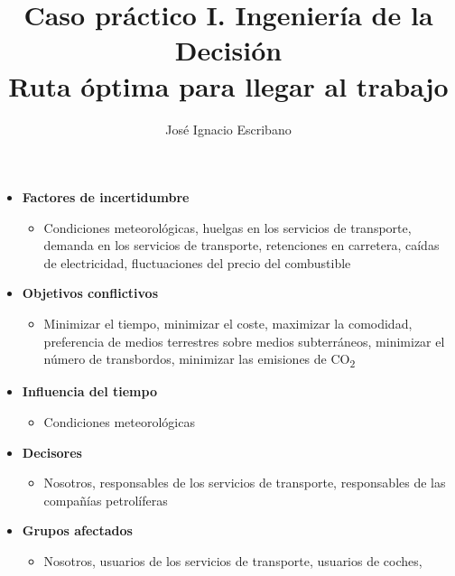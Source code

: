 \documentclass[11pt,a4paper,twoside,openright,final]{article}
\author{José Ignacio Escribano}
\title{Caso práctico I. Ingeniería de la Decisión \\ \textbf{Ruta óptima para llegar al trabajo}}
\begin{document}
\maketitle

\begin{itemize}

\item \textbf{Factores de incertidumbre}

\begin{itemize}
\item Condiciones meteorológicas, huelgas en los servicios de transporte, demanda en los servicios de transporte, retenciones en carretera, caídas de electricidad, fluctuaciones del precio del combustible
\end{itemize}

\item \textbf{Objetivos conflictivos}

\begin{itemize}
\item Minimizar el tiempo, minimizar el coste, maximizar la comodidad, preferencia de medios terrestres sobre medios subterráneos, minimizar el número de transbordos, minimizar las emisiones de CO\textsubscript{2}
\end{itemize}

\item \textbf{Influencia del tiempo}

\begin{itemize}
\item Condiciones meteorológicas
\end{itemize}

\item \textbf{Decisores}

\begin{itemize}
\item Nosotros, responsables de los servicios de transporte, responsables de las compañías petrolíferas
\end{itemize}

\item \textbf{Grupos afectados}

\begin{itemize}
\item Nosotros, usuarios de los servicios de transporte, usuarios de coches,  
\end{itemize}

\end{itemize}
\end{document}
